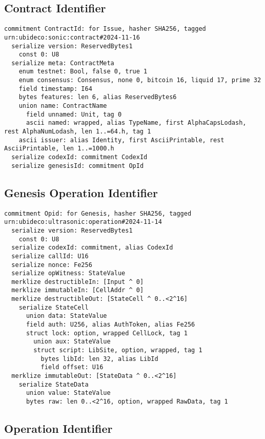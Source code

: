 \documentclass[9pt,oneside]{amsart}
\begin{document}
\subsection{Contract Identifier}\label{ap:ContractId}

\begin{verbatim}
commitment ContractId: for Issue, hasher SHA256, tagged urn:ubideco:sonic:contract#2024-11-16 
  serialize version: ReservedBytes1
    const 0: U8
  serialize meta: ContractMeta
    enum testnet: Bool, false 0, true 1 
    enum consensus: Consensus, none 0, bitcoin 16, liquid 17, prime 32 
    field timestamp: I64 
    bytes features: len 6, alias ReservedBytes6 
    union name: ContractName 
      field unnamed: Unit, tag 0 
      ascii named: wrapped, alias TypeName, first AlphaCapsLodash, rest AlphaNumLodash, len 1..=64.h, tag 1 
    ascii issuer: alias Identity, first AsciiPrintable, rest AsciiPrintable, len 1..=1000.h 
  serialize codexId: commitment CodexId
  serialize genesisId: commitment OpId
\end{verbatim}

\subsection{Genesis Operation Identifier}\label{ap:GenesisId}

\begin{verbatim}
commitment Opid: for Genesis, hasher SHA256, tagged urn:ubideco:ultrasonic:operation#2024-11-14 
  serialize version: ReservedBytes1
    const 0: U8
  serialize codexId: commitment, alias CodexId
  serialize callId: U16
  serialize nonce: Fe256
  serialize opWitness: StateValue
  merklize destructibleIn: [Input ^ 0]
  merklize immutableIn: [CellAddr ^ 0]
  merklize destructibleOut: [StateCell ^ 0..<2^16]
    serialize StateCell
      union data: StateValue
      field auth: U256, alias AuthToken, alias Fe256
      struct lock: option, wrapped CellLock, tag 1
        union aux: StateValue
        struct script: LibSite, option, wrapped, tag 1
          bytes libId: len 32, alias LibId
          field offset: U16
  merklize immutableOut: [StateData ^ 0..<2^16]
    serialize StateData
      union value: StateValue
      bytes raw: len 0..<2^16, option, wrapped RawData, tag 1
\end{verbatim}

\newpage
\subsection{Operation Identifier}\label{ap:OpId}
\end{document}

